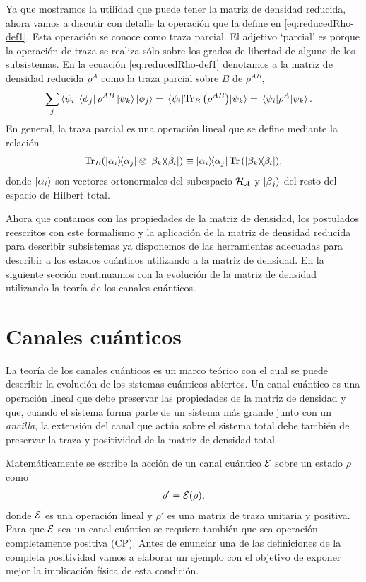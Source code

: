 Ya que mostramos la utilidad que puede tener la matriz de densidad
reducida, ahora vamos a discutir con detalle la operación que 
la define en \eqref{eq:reducedRho-def1}. 
Esta operación se conoce como traza parcial. El adjetivo `parcial'
es porque la operación de traza se realiza sólo sobre los grados 
de libertad de alguno de los subsistemas. En la ecuación 
\eqref{eq:reducedRho-def1} denotamos a la matriz de densidad 
reducida $\rho^A$ como la traza parcial sobre $B$ de $\rho^{AB}$,
\begin{align} 
	\sum _j \bra{\psi_i}\bra{\phi_j}\rho^{AB}\ket{\psi_k}\ket{\phi_j}
	&=\matrixel{\psi_i}{\Tr_B\qty(\rho^{AB})}{\psi_k}
	= \matrixel{\psi_i}{\rho^A}{\psi_k}.
	\label{eq:partialTrace-def}
\end{align}
En general, la traza parcial es una operación lineal
que se define mediante la relación~\cite{nielsen_chuang_2011}
\begin{align}
	\Tr_B (\dyad{\alpha_i}{\alpha_j}\otimes \dyad{\beta_k}{\beta_l})
	\equiv
	\dyad{\alpha_i}{\alpha_j}\Tr \qty(\dyad{\beta_k}{\beta_l}),
	\label{eq:part_trace-def}
\end{align}
donde $\ket{\alpha_i}$ son vectores ortonormales del subespacio $\mathcal{H}_A$
y $\ket{\beta_j}$ del resto del espacio de Hilbert total.

Ahora que contamos con las propiedades de la matriz de densidad, 
los postulados reescritos con este formalismo y la aplicación de la matriz
de densidad reducida para describir subsistemas ya disponemos de
las herramientas adecuadas para describir a los estados cuánticos 
utilizando a la matriz de densidad. En la siguiente sección continuamos 
con la evolución de la matriz de densidad utilizando la teoría de los 
canales cuánticos.

\section{Canales cuánticos}\label{sec:qtm-channels} %

La teoría de los canales cuánticos es un marco teórico con el cual 
se puede describir la evolución de los sistemas cuánticos abiertos.
Un canal cuántico es una operación lineal que debe preservar las 
propiedades de la matriz de densidad y que, cuando el sistema forma
parte de un sistema más grande junto con un \textit{ancilla}, la
extensión del canal que actúa sobre el sistema total debe también 
de preservar la traza y positividad de la matriz de densidad total.

Matemáticamente se escribe la acción de un canal cuántico $\mathcal{E}$ 
sobre un estado $\rho$ como
\begin{align} \label{eq:E(rho)}
\rho' = \mathcal{E} (\rho),
\end{align} 
donde $\mathcal{E}$ es una operación lineal y $\rho'$ es una matriz de
traza unitaria y positiva. Para que $\mathcal{E}$ sea un canal cuántico 
se requiere también que sea operación completamente positiva (CP). 
Antes de enunciar una de las definiciones de la completa positividad
vamos a elaborar un ejemplo con el objetivo de exponer mejor la 
implicación física de esta condición.

